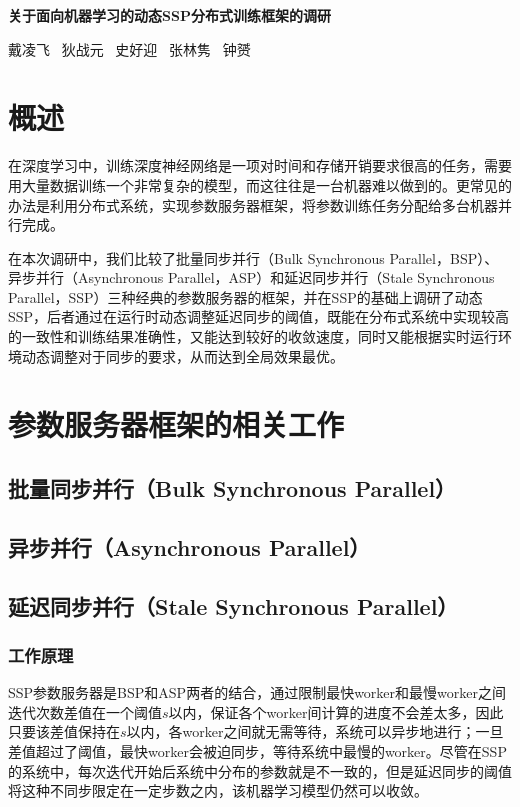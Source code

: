 \documentclass[11pt]{article}
\begin{document}
    
    \pagestyle{fancy}
    \chead{}
    
    \begin{center}
        {\LARGE \bf 关于面向机器学习的动态SSP分布式训练框架的调研}
    \end{center}
    \begin{center}
        \begin{kaishu}
            戴凌飞 \  狄战元 \  史好迎 \  张林隽 \  钟赟
        \end{kaishu}
    \end{center}


    \section{概述}
    在深度学习中，训练深度神经网络是一项对时间和存储开销要求很高的任务，需要用大量数据训练一个非常复杂的模型，而这往往是一台机器难以做到的。更常见的办法是利用分布式系统，实现参数服务器框架，将参数训练任务分配给多台机器并行完成。

    在本次调研中，我们比较了批量同步并行（Bulk Synchronous Parallel，BSP）、异步并行（Asynchronous Parallel，ASP）和延迟同步并行（Stale Synchronous Parallel，SSP）三种经典的参数服务器的框架，并在SSP的基础上调研了动态SSP，后者通过在运行时动态调整延迟同步的阈值，既能在分布式系统中实现较高的一致性和训练结果准确性，又能达到较好的收敛速度，同时又能根据实时运行环境动态调整对于同步的要求，从而达到全局效果最优。
    

    \section{参数服务器框架的相关工作}
    \subsection{批量同步并行（Bulk Synchronous Parallel）}

    \subsection{异步并行（Asynchronous Parallel）}

    \subsection{延迟同步并行（Stale Synchronous Parallel）}
    \subsubsection{工作原理} 
    SSP参数服务器是BSP和ASP两者的结合，通过限制最快worker和最慢worker之间迭代次数差值在一个阈值$s$以内，保证各个worker间计算的进度不会差太多，因此只要该差值保持在$s$以内，各worker之间就无需等待，系统可以异步地进行；一旦差值超过了阈值，最快worker会被迫同步，等待系统中最慢的worker。尽管在SSP的系统中，每次迭代开始后系统中分布的参数就是不一致的，但是延迟同步的阈值将这种不同步限定在一定步数之内，该机器学习模型仍然可以收敛。
\end{document}
